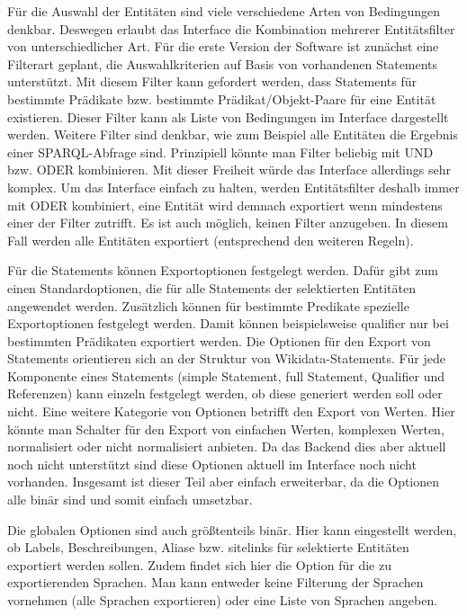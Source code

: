 Für die Auswahl der Entitäten sind viele verschiedene Arten von Bedingungen denkbar.
Deswegen erlaubt das Interface die Kombination mehrerer Entitätsfilter von unterschiedlicher Art.
Für die erste Version der Software ist zunächst eine Filterart geplant, die Auswahlkriterien auf Basis von vorhandenen Statements unterstützt. 
Mit diesem Filter kann gefordert werden, dass Statements für bestimmte Prädikate bzw. bestimmte Prädikat/Objekt-Paare für eine Entität existieren.
Dieser Filter kann als Liste von Bedingungen im Interface dargestellt werden.
Weitere Filter sind denkbar, wie zum Beispiel alle Entitäten die Ergebnis einer SPARQL-Abfrage sind.
Prinzipiell könnte man Filter beliebig mit UND bzw. ODER kombinieren.
Mit dieser Freiheit würde das Interface allerdings sehr komplex.
Um das Interface einfach zu halten, werden Entitätsfilter deshalb immer mit ODER kombiniert, eine Entität wird demnach exportiert wenn mindestens einer der Filter zutrifft.
Es ist auch möglich, keinen Filter anzugeben.
In diesem Fall werden alle Entitäten exportiert (entsprechend den weiteren Regeln).

Für die Statements können Exportoptionen festgelegt werden.
Dafür gibt zum einen Standardoptionen, die für alle Statements der selektierten Entitäten angewendet werden.
Zusätzlich können für bestimmte Predikate spezielle Exportoptionen festgelegt werden.
Damit können beispielsweise qualifier nur bei bestimmten Prädikaten exportiert werden.
Die Optionen für den Export von Statements orientieren sich an der Struktur von Wikidata-Statements.
Für jede Komponente eines Statements (simple Statement, full Statement, Qualifier und Referenzen) kann einzeln festgelegt werden, ob diese generiert werden soll oder nicht.
Eine weitere Kategorie von Optionen betrifft den Export von Werten.
Hier könnte man Schalter für den Export von einfachen Werten, komplexen Werten, normalisiert oder nicht normalisiert anbieten.
Da das Backend dies aber aktuell noch nicht unterstützt sind diese Optionen aktuell im Interface noch nicht vorhanden.
Insgesamt ist dieser Teil aber einfach erweiterbar, da die Optionen alle binär sind und somit einfach umsetzbar.

Die globalen Optionen sind auch größtenteils binär.
Hier kann eingestellt werden, ob Labels, Beschreibungen, Aliase bzw. sitelinks für selektierte Entitäten exportiert werden sollen.
Zudem findet sich hier die Option für die zu exportierenden Sprachen.
Man kann entweder keine Filterung der Sprachen vornehmen (alle Sprachen exportieren) oder eine Liste von Sprachen angeben.

